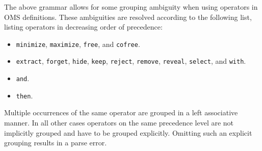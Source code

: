 \documentclass[10pt,fleqn,%
\ifpretendfinal
final%
\else
draft%
\fi,
]{scrreprt}
\newcommand*{\syntax}[1]{\texttt{#1}}
\begin{document}

The above grammar allows for some grouping ambiguity when using operators in
OMS definitions. These ambiguities are resolved according to the following
list, listing operators in decreasing order of precedence:
\begin{itemize}
  \item \syntax{minimize}, \syntax{maximize}, \syntax{free}, and \syntax{cofree}. 
  \item \syntax{extract}, \syntax{forget}, \syntax{hide}, \syntax{keep},
    \syntax{reject}, \syntax{remove}, \syntax{reveal}, \syntax{select}, and
    \syntax{with}.
  \item \syntax{and}.
  \item \syntax{then}.
\end{itemize}
Multiple occurrences of the same operator are grouped in a left associative
manner. In all other cases operators on the same precedence level are not
implicitly grouped and have to be grouped explicitly. Omitting such an explicit
grouping results in a parse error.
\end{document}
